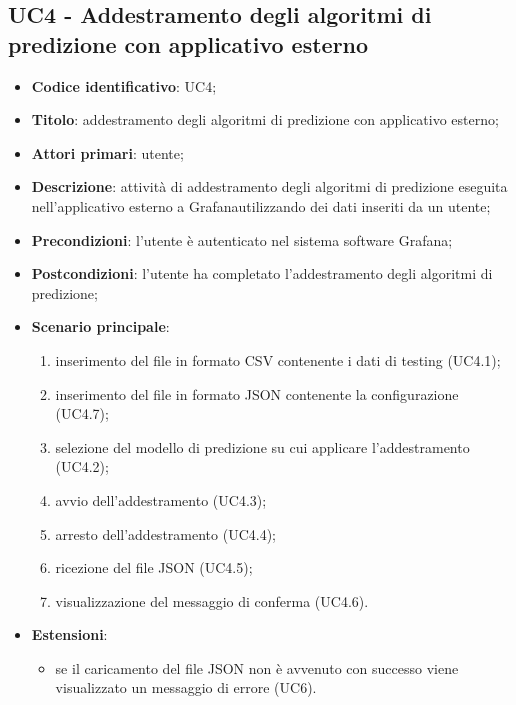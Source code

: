\subsection{UC4 - Addestramento degli algoritmi di predizione con applicativo esterno}
\begin{itemize}
    \item \textbf{Codice identificativo}: UC4;
    \item \textbf{Titolo}: addestramento degli algoritmi di predizione con applicativo esterno;
    \item \textbf{Attori primari}: utente;
    \item \textbf{Descrizione}: attività di addestramento degli algoritmi di predizione eseguita nell'applicativo esterno a Grafana\glosp utilizzando dei dati inseriti da un utente;
    \item \textbf{Precondizioni}: l'utente è autenticato nel sistema software Grafana\glo;
    \item \textbf{Postcondizioni}: l'utente ha completato l'addestramento degli algoritmi di predizione;
    \item \textbf{Scenario principale}: 
        \begin{enumerate}
            \item inserimento del file in formato CSV contenente i dati di testing (UC4.1);
            \item inserimento del file in formato JSON contenente la configurazione (UC4.7);
            \item selezione del modello di predizione su cui applicare l'addestramento (UC4.2);
            \item avvio dell'addestramento (UC4.3);
            \item arresto dell'addestramento (UC4.4);
            \item ricezione del file JSON (UC4.5);
            \item visualizzazione del messaggio di conferma (UC4.6). 
        \end{enumerate}
    \item \textbf{Estensioni}:
    \begin{itemize}
    	\item se il caricamento del file JSON non è avvenuto con successo viene visualizzato un messaggio di errore (UC6).
    \end{itemize}
\end{itemize}

